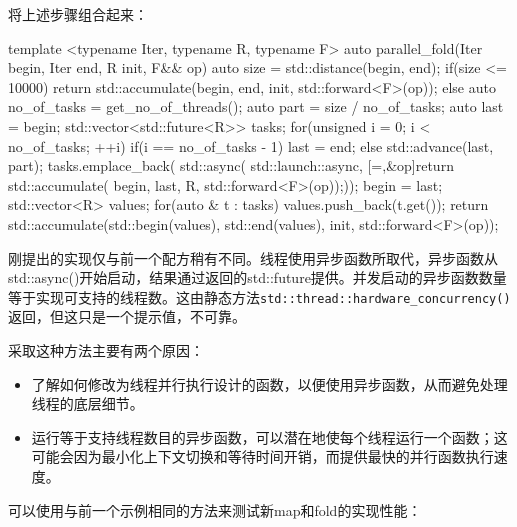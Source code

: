 将上述步骤组合起来：

\begin{cpp}
template <typename Iter, typename R, typename F>
auto parallel_fold(Iter begin, Iter end, R init, F&& op)
{
    auto size = std::distance(begin, end);
    if(size <= 10000)
        return std::accumulate(begin, end, init, std::forward<F>(op));
    else
    {
        auto no_of_tasks = get_no_of_threads();
        auto part = size / no_of_tasks;
        auto last = begin;
        std::vector<std::future<R>> tasks;
        for(unsigned i = 0; i < no_of_tasks; ++i)
        {
            if(i == no_of_tasks - 1) last = end;
            else std::advance(last, part);
            tasks.emplace_back(
            std::async(
            std::launch::async,
                [=,&op]{return std::accumulate(
                                    begin, last, R{},
                                    std::forward<F>(op));}));
            begin = last;
        }
        std::vector<R> values;
        for(auto & t : tasks)
        values.push_back(t.get());
        return std::accumulate(std::begin(values), std::end(values),
                               init, std::forward<F>(op));
    }
}
\end{cpp}


刚提出的实现仅与前一个配方稍有不同。线程使用异步函数所取代，异步函数从std::async()开始启动，结果通过返回的std::future提供。并发启动的异步函数数量等于实现可支持的线程数。这由静态方法\verb|std::thread::hardware_concurrency()|返回，但这只是一个提示值，不可靠。

采取这种方法主要有两个原因：

\begin{itemize}
\item
了解如何修改为线程并行执行设计的函数，以便使用异步函数，从而避免处理线程的底层细节。

\item
运行等于支持线程数目的异步函数，可以潜在地使每个线程运行一个函数；这可能会因为最小化上下文切换和等待时间开销，而提供最快的并行函数执行速度。
\end{itemize}

可以使用与前一个示例相同的方法来测试新map和fold的实现性能：

